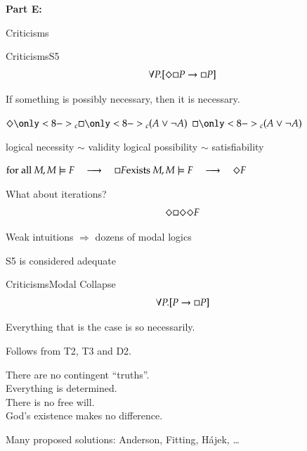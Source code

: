 \begin{transitionframe}
\textbf{Part E:}

Criticisms
\end{transitionframe}

\begin{frame}{Criticisms}{S5} \centering
$$
\forall P.[ \Diamond \Box P \rightarrow \Box P ] 
$$

\medskip

If something is possibly necessary, then it is necessary.

\pause

\bigskip


$
\pos\only<8->{_c} \nec\only<8->{_c} (A \vee \neg A)
$
\pause
\qquad 
$
\nec\only<8->{_c} (A \vee \neg A)
$

\pause

\bigskip

logical necessity $\sim$ validity
\hfill
logical possibility $\sim$ satisfiability

\pause 

\medskip

$ 
\textrm{for all } M, M \models F 
\quad \longrightarrow \quad
\nec F
\hfill
\textrm{exists } M, M \models F 
\quad \longrightarrow \quad
\pos F
$

\pause

\bigskip

What about iterations?
$$
\Diamond \Box \Diamond \Diamond F
$$

\medskip

\pause

Weak intuitions $\Rightarrow$ dozens of modal logics

\medskip

\pause

\alert{S5 is considered adequate}


\end{frame}


\begin{frame}{Criticisms}{Modal Collapse} \centering
$$
\forall P.[ P \rightarrow \Box P ] 
$$

\medskip

Everything that is the case is so necessarily.

\pause

\medskip

Follows from T2, T3 and D2.

\pause

\medskip

There are no contingent ``truths''. \\ \pause
Everything is determined. \\ \pause
There is no free will. \\ \pause
God's existence makes no difference.

\pause
\bigskip

Many proposed solutions: Anderson, Fitting, H\'ajek, \ldots
 
\end{frame}


